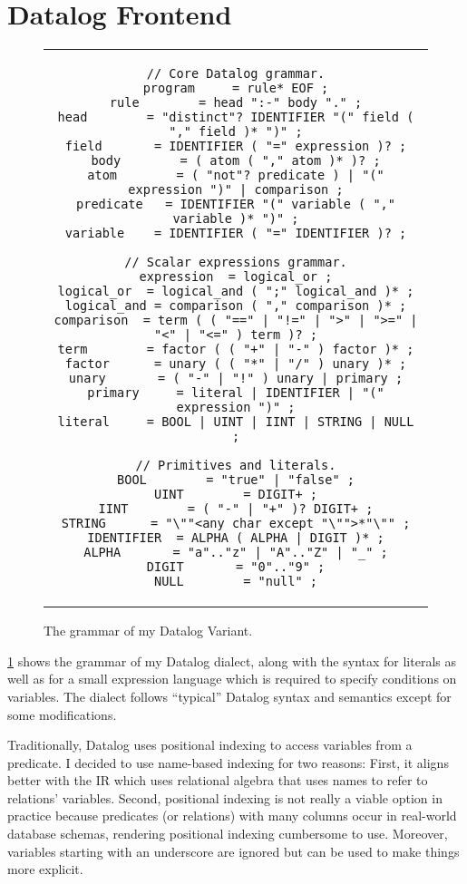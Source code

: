 \section{Datalog Frontend}\label{sec:datalog-frontend}

\begin{figure}[htpb]
	\centering
	\begin{tabular}{c}
		\begin{lstlisting}[keepspaces]
// Core Datalog grammar.
program     = rule* EOF ;
rule        = head ":-" body "." ;
head        = "distinct"? IDENTIFIER "(" field ( "," field )* ")" ;
field       = IDENTIFIER ( "=" expression )? ;
body        = ( atom ( "," atom )* )? ;
atom        = ( "not"? predicate ) | "(" expression ")" | comparison ;
predicate   = IDENTIFIER "(" variable ( "," variable )* ")" ;
variable    = IDENTIFIER ( "=" IDENTIFIER )? ;

// Scalar expressions grammar.
expression  = logical_or ;
logical_or  = logical_and ( ";" logical_and )* ;
logical_and = comparison ( "," comparison )* ;
comparison  = term ( ( "==" | "!=" | ">" | ">=" | "<" | "<=" ) term )? ;
term        = factor ( ( "+" | "-" ) factor )* ;
factor      = unary ( ( "*" | "/" ) unary )* ;
unary       = ( "-" | "!" ) unary | primary ;
primary     = literal | IDENTIFIER | "(" expression ")" ;
literal     = BOOL | UINT | IINT | STRING | NULL ;

// Primitives and literals.
BOOL        = "true" | "false" ;
UINT        = DIGIT+ ;
IINT        = ( "-" | "+" )? DIGIT+ ;
STRING      = "\""<any char except "\"">*"\"" ;
IDENTIFIER  = ALPHA ( ALPHA | DIGIT )* ;
ALPHA       = "a".."z" | "A".."Z" | "_" ;
DIGIT       = "0".."9" ;
NULL        = "null" ;\end{lstlisting}
	\end{tabular}
	\caption{The grammar of my Datalog Variant.}\label{code:datalog-grammar}
\end{figure}

\ref{code:datalog-grammar} shows the grammar of my Datalog dialect\footnotemark{},
along with the syntax for literals as well as for a small expression language
which is required to specify conditions on variables.
The dialect follows ``typical'' Datalog syntax and semantics
except for some modifications.


Traditionally, Datalog uses positional indexing to access variables from a
predicate. I decided to use name-based indexing for two reasons:
First, it aligns better with the \ac{IR} which uses relational algebra
that uses names to refer to relations' variables.
Second, positional indexing is not really a viable option in practice because
predicates (or relations) with many columns occur in real-world
database schemas, rendering positional indexing cumbersome to use.
Moreover, variables starting with an underscore are ignored but can be used
to make things more explicit.

